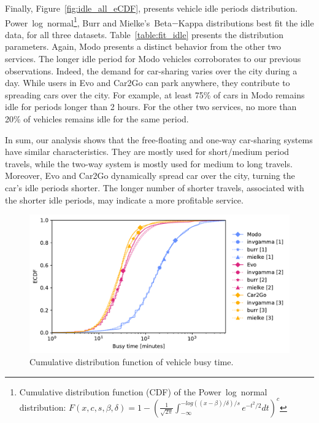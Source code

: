 Finally, Figure~\ref{fig:idle_all_eCDF}, presents vehicle idle periods distribution.  Power~log~normal\footnote{Cumulative distribution function (CDF) of the Power~log~normal distribution: $F(x,c,s,\beta,\delta)=1-\left(\frac{1}{\sqrt{2\pi}}\int_{-\infty}^{-log((x-\beta)/\delta)/s}e^{-t^{2}/2}dt\right)^{c}$}, Burr and Mielke's~Beta$-$Kappa distributions best fit the idle data, for all three datasets. Table~\ref{table:fit_idle} presents the distribution parameters. 
Again, Modo presents a distinct behavior from the other two services. The longer idle period for Modo vehicles corroborates to our previous observations. Indeed, the demand for car-sharing varies over the city during a day. While users in Evo and Car2Go can park anywhere, they contribute to spreading cars over the city. For example, at least 75\% of cars in Modo remains idle for periods longer than 2 hours. For the other two services, no more than 20\% of vehicles remains idle for the same period.

In sum, our analysis shows that the free-floating and one-way car-sharing systems have similar characteristics. They are mostly used for short/medium period travels, while the two-way system is mostly used for medium to long travels. 
Moreover, Evo and Car2Go dynamically spread car over the city, turning the car's idle periods shorter. The longer number of shorter travels, associated with the shorter idle periods, may indicate a more profitable service.

\begin{figure}[tbh]
   \centering
   \includegraphics[width=0.85\columnwidth]{images_test/CDF_Fit_final.pdf}
   \caption{Cumulative distribution function of vehicle busy time.}
   \label{fig:busy_all_eCDF}
\end{figure}


